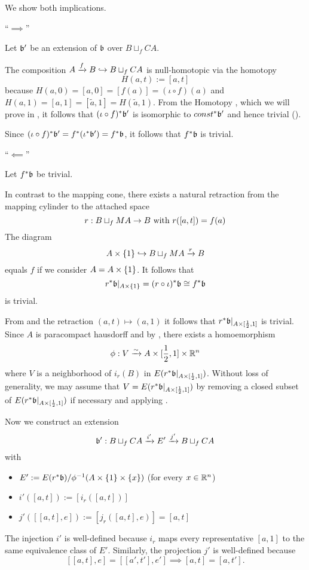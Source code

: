 \begin{myproof}
    We show both implications.

    ``$\implies$''

    Let $\bb'$ be an extension of $\bb$ over $B \sqcup_f CA$.

    The composition $A \xto{f} B \incl B \sqcup_f CA$ is
    null-homotopic via the homotopy
    \[ H(a, t) := [a, t] \]
    because $H(a, 0) = [a, 0] = [f(a)] = (\iota \circ f)(a)$
     and $H(a, 1) = [a, 1] = [\tilde{a}, 1] = H(\tilde{a}, 1)$.
    From the Homotopy ,
    which we will prove in ,
    it follows that $\ind{(\iota \circ f)}\bb'$ is
    isomorphic to $\ind{const}\bb'$ and hence trivial ().

    Since $\ind{(\iota \circ f)}\bb' = \ind{f}(\ind{\iota}\bb') = \ind{f}\bb$,
    it follows that $\ind{f}\bb$ is trivial.

    ``$\impliedby$''

    Let $\ind{f}\bb$ be trivial.

    In contrast to the mapping cone,
    there exists a natural retraction from the mapping cylinder to the attached space
    \[ r: B \sqcup_f MA \to B \twith r([a, t]) = f(a) \]
    The diagram
    \[ A \times \{1\} \incl B \sqcup_f MA \xto{r} B \]
    equals $f$ if we consider $A = \cylup{A}$.
    It follows that
    \[ \ind{r}\bb\restr{A \times \{1\}} = \ind{(r \circ \iota)}\bb \cong \ind{f}\bb \]
    is trivial.

    From  and the retraction $(a, t) \mapsto (a, 1)$
    it follows that $\ind{r}\bb\restr{A \times [\half, 1]}$ is trivial.
    Since $A$ is paracompact hausdorff and by ,
    there exists a homoemorphism
    \[ \phi: V \isomto A \times [\half, 1] \times \R^n \]
    where $V$ is a neighborhood of $i_r(B)$ in $E(\ind{r}\bb\restr{A \times [\half, 1]})$.
    Without loss of generality,
    we may assume that $V = E(\ind{r}\bb\restr{A \times [\half, 1]})$
    by removing a closed subset of $E(\ind{r}\bb\restr{A \times [\half, 1]})$
    if necessary and applying .

    Now we construct an extension
    \[ \bundledef{\bb'}{B \sqcup_f CA}{E'}{i'}{j'} \]
    with
    \begin{itemize}
        \item $E' := E(\ind{r}\bb) / \inv{\phi}(A \times \{1\} \times \{x\})$ (for every $x \in \R^n$)
        \item $i'([a, t]) := [i_r([a, t])]$
        \item $j'([[a, t], e]) := [j_r([a, t], e)] = [a, t]$
    \end{itemize}
    The injection $i'$ is well-defined because $i_r$ maps every
    representative $[a, 1]$ to the same equivalence class of $E'$.
    Similarly, the projection $j'$ is well-defined because
    \[ [[a, t], e] = [[a', t'], e'] \implies  [a, t] = [a, t']. \]


\end{myproof}
